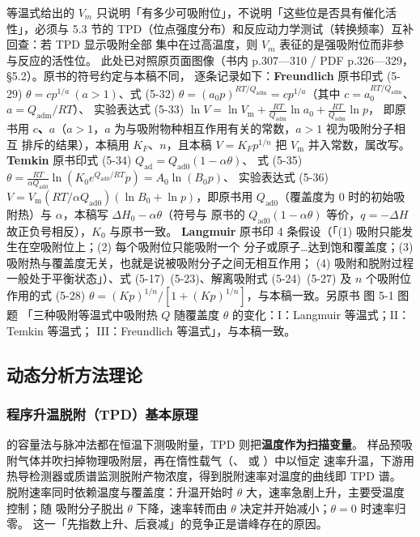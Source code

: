 \begin{crosscheck}
等温式给出的 $V_m$ 只说明「有多少可吸附位」，不说明「这些位是否具有催化活性」，必须与
5.3 节的 TPD（位点强度分布）和反应动力学测试（转换频率）互补回查：若 TPD 显示吸附全部
集中在过高温度，则 $V_m$ 表征的是强吸附位而非参与反应的活性位。
此处已对照原页面图像（书内 p.307—310 / PDF p.326—329，§5.2）。原书的符号约定与本稿不同，
逐条记录如下：\textbf{Freundlich} 原书印式 (5-29) $\theta=cp^{1/a}\ (a>1)$、式 (5-32)
$\theta=(a_0p)^{RT/Q_{\text{adm}}}=cp^{1/a}$（其中 $c=a_0^{RT/Q_{\text{adm}}}$、$a=Q_{\text{adm}}/RT$）、
实验表达式 (5-33) $\ln V=\ln V_{\text{m}}+\frac{RT}{Q_{\text{adm}}}\ln a_0+\frac{RT}{Q_{\text{adm}}}\ln p$，
即原书用 \textbf{$c$、$a$}（$a>1$，$a$ 为与吸附物种相互作用有关的常数，$a>1$ 视为吸附分子相互
排斥的结果），本稿用 $K_F$、$n$，且本稿 $V=K_Fp^{1/n}$ 把 $V_{\text{m}}$ 并入常数，属改写。
\textbf{Temkin} 原书印式 (5-34) $Q_{\text{ad}}=Q_{\text{ad}0}(1-\alpha\theta)$、
式 (5-35) $\theta=\frac{RT}{\alpha Q_{\text{ad}0}}\ln(K_0e^{Q_{\text{ad}0}/RT}p)=A_0\ln(B_0p)$、
实验表达式 (5-36) $V=V_{\text{m}}(RT/\alpha Q_{\text{ad}0})(\ln B_0+\ln p)$，即原书用
$Q_{\text{ad}0}$（覆盖度为 0 时的初始吸附热）与 $\alpha$，本稿写 $\Delta H_0-\alpha\theta$（符号与
原书的 $Q_{\text{ad}0}(1-\alpha\theta)$ 等价，$q=-\Delta H$ 故正负号相反），$K_0$ 与原书一致。
\textbf{Langmuir} 原书印 4 条假设（「(1) 吸附只能发生在空吸附位上；(2) 每个吸附位只能吸附一个
分子或原子…达到饱和覆盖度；(3) 吸附热与覆盖度无关，也就是说被吸附分子之间无相互作用；
(4) 吸附和脱附过程一般处于平衡状态」）、式 (5-17)~(5-23)、解离吸附式 (5-24)~(5-27) 及
$n$ 个吸附位作用的式 (5-28) $\theta=(Kp)^{1/n}/[1+(Kp)^{1/n}]$，与本稿一致。另原书 图 5-1 图题
「三种吸附等温式中吸附热 $Q$ 随覆盖度 $\theta$ 的变化：I：Langmuir 等温式；II：Temkin 等温式；
III：Freundlich 等温式」，与本稿一致。
\end{crosscheck}

\subsection{动态分析方法理论}

\subsubsection{程序升温脱附（TPD）基本原理}

 的容量法与脉冲法都在恒温下测吸附量，TPD 则把\textbf{温度作为扫描变量}。
样品预吸附气体并吹扫掉物理吸附层，再在惰性载气（、 或 ）中以恒定
速率升温，下游用热导检测器或质谱监测脱附产物浓度，得到脱附速率对温度的曲线即 TPD 谱。
脱附速率同时依赖温度与覆盖度：升温开始时 $\theta$ 大，速率急剧上升，主要受温度控制；随
吸附分子脱出 $\theta$ 下降，速率转而由 $\theta$ 决定并开始减小；$\theta=0$ 时速率归零。
这一「先指数上升、后衰减」的竞争正是谱峰存在的原因。

